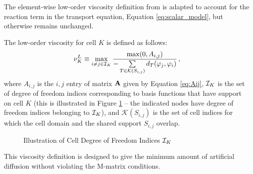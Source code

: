 The element-wise low-order viscosity definition from \cite{guermond_firstorder} is
adapted to account for the reaction term in the transport equation, 
Equation \eqref{eq:scalar_model}, but otherwise remains unchanged.
\begin{defn}
  The low-order viscosity for cell $K$ is defined as follows:
  \begin{equation}
    \nu^L_K \equiv \max\limits_{i\ne j\in\mathcal{I}_K}
      \frac{\max(0,A_{i,j})}
      {-\sum\limits_{T\in \mathcal{K}(S_{i,j})}d_T(\varphi_j,\varphi_i)}
      \,,
  \end{equation}
  where $A_{i,j}$ is the $i,j$ entry of matrix $\mathbf{A}$ 
  given by Equation \eqref{eq:Aij}, $\mathcal{I}_K$ is the set of degree of freedom
  indices corresponding to basis functions that have support on cell $K$
  (this is illustrated in Figure \ref{fig:cell_indices} -- the indicated
  nodes have degree of freedom indices belonging to $\mathcal{I}_K$), and
  $\mathcal{K}(S_{i,j})$ is the set of cell indices for which the cell
  domain and the shared support $S_{i,j}$ overlap.
\end{defn}
\begin{figure}[ht]
   \centering
     
      \caption{Illustration of Cell Degree of Freedom Indices $\mathcal{I}_K$}
   \label{fig:cell_indices}
\end{figure}
This viscosity definition is designed to give the minimum amount of artificial
diffusion without violating the M-matrix conditions.

